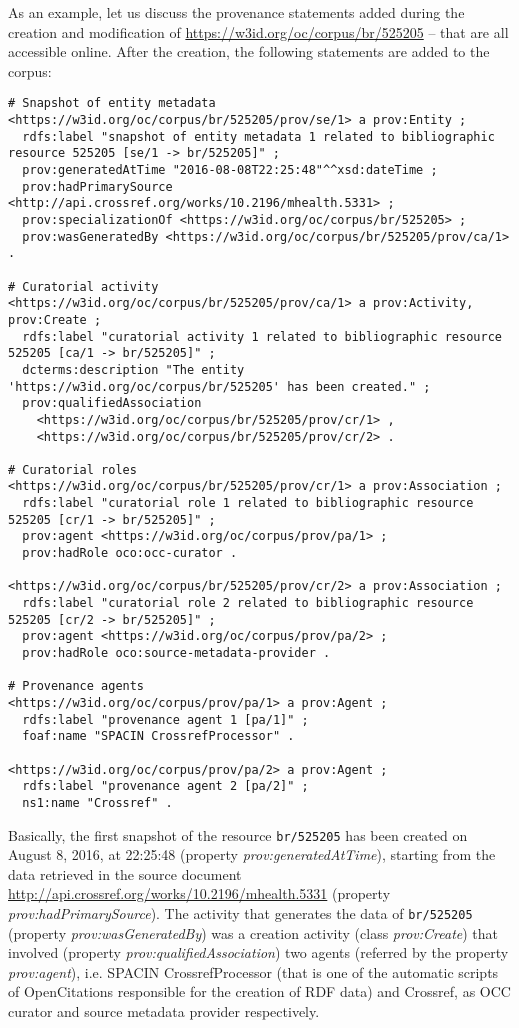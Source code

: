 \documentclass[runningheads,a4paper]{llncs}
\begin{document}
As an example, let us discuss the provenance statements added during the creation and modification of \url{https://w3id.org/oc/corpus/br/525205} -- that are all accessible online. After the creation, the following statements are added to the corpus:

\begin{lstlisting}[mathescape]
# Snapshot of entity metadata
<https://w3id.org/oc/corpus/br/525205/prov/se/1> a prov:Entity ;
  rdfs:label "snapshot of entity metadata 1 related to bibliographic resource 525205 [se/1 -> br/525205]" ;
  prov:generatedAtTime "2016-08-08T22:25:48"^^xsd:dateTime ;
  prov:hadPrimarySource <http://api.crossref.org/works/10.2196/mhealth.5331> ;
  prov:specializationOf <https://w3id.org/oc/corpus/br/525205> ;
  prov:wasGeneratedBy <https://w3id.org/oc/corpus/br/525205/prov/ca/1> .

# Curatorial activity
<https://w3id.org/oc/corpus/br/525205/prov/ca/1> a prov:Activity, prov:Create ;
  rdfs:label "curatorial activity 1 related to bibliographic resource 525205 [ca/1 -> br/525205]" ;
  dcterms:description "The entity 'https://w3id.org/oc/corpus/br/525205' has been created." ;
  prov:qualifiedAssociation 
    <https://w3id.org/oc/corpus/br/525205/prov/cr/1> ,
    <https://w3id.org/oc/corpus/br/525205/prov/cr/2> .

# Curatorial roles
<https://w3id.org/oc/corpus/br/525205/prov/cr/1> a prov:Association ;
  rdfs:label "curatorial role 1 related to bibliographic resource 525205 [cr/1 -> br/525205]" ;
  prov:agent <https://w3id.org/oc/corpus/prov/pa/1> ;
  prov:hadRole oco:occ-curator .

<https://w3id.org/oc/corpus/br/525205/prov/cr/2> a prov:Association ;
  rdfs:label "curatorial role 2 related to bibliographic resource 525205 [cr/2 -> br/525205]" ;
  prov:agent <https://w3id.org/oc/corpus/prov/pa/2> ;
  prov:hadRole oco:source-metadata-provider .

# Provenance agents
<https://w3id.org/oc/corpus/prov/pa/1> a prov:Agent ;
  rdfs:label "provenance agent 1 [pa/1]" ;
  foaf:name "SPACIN CrossrefProcessor" .

<https://w3id.org/oc/corpus/prov/pa/2> a prov:Agent ;
  rdfs:label "provenance agent 2 [pa/2]" ;
  ns1:name "Crossref" .
\end{lstlisting}

Basically, the first snapshot of the resource \Verb+br/525205+ has been created on August 8, 2016, at 22:25:48 (property {\em prov:generatedAtTime}), starting from the data retrieved in the source document \url{http://api.crossref.org/works/10.2196/mhealth.5331} (property {\em prov:hadPrimarySource}). The activity that generates the data of \Verb+br/525205+ (property {\em prov:wasGeneratedBy}) was a creation activity (class {\em prov:Create}) that involved (property {\em prov:qualifiedAssociation}) two agents (referred by the property {\em prov:agent}), i.e. SPACIN CrossrefProcessor (that is one of the automatic scripts of OpenCitations responsible for the creation of RDF data) and Crossref, as OCC curator and source metadata provider respectively.
\end{document}
